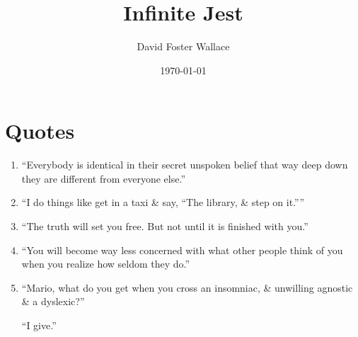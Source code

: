 \documentclass{article}
\title{Infinite Jest}
\author{David Foster Wallace}
\date{\today}
\numberwithin{equation}{section}
\begin{document}
\maketitle
\tableofcontents


\section{Quotes}

\begin{enumerate}
	\item ``Everybody is identical in their secret unspoken belief that way deep down they are different from everyone else.''
	\item ``I do things like get in a taxi \& say, ``The library, \& step on it.''''
	\item ``The truth will set you free. But not until it is finished with you.''
	\item ``You will become way less concerned with what other people think of you when you realize how seldom they do.''
	\item ``Mario, what do you get when you cross an insomniac, \& unwilling agnostic \& a dyslexic?''
	
	``I give.''
	

\end{enumerate}
\end{document}
